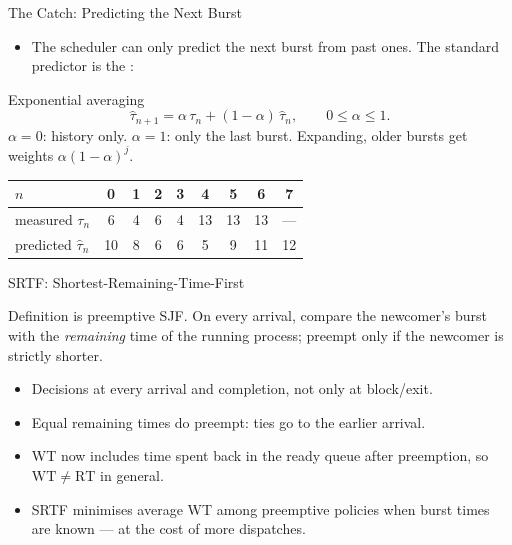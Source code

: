 \documentclass[aspectratio=169]{beamer}
\begin{document}
\begin{frame}{The Catch: Predicting the Next Burst}
  \begin{itemize}
    \item The scheduler can only predict the next burst from past ones. The
      standard predictor is the :
  \end{itemize}
  \begin{block}{Exponential averaging}
    \[
      \hat{\tau}_{n+1}=\alpha\,\tau_n+(1-\alpha)\,\hat{\tau}_n,
      \qquad 0\le\alpha\le1.
    \]
    $\alpha=0$: history only. $\alpha=1$: only the last burst. Expanding,
    older bursts get weights $\alpha(1-\alpha)^j$.
  \end{block}
  \vspace{0.05cm}
  \centering
  \scriptsize
  \begin{tabular}{lcccccccc}
    \toprule
    $n$ & 0 & 1 & 2 & 3 & 4 & 5 & 6 & 7 \\
    \midrule
    measured $\tau_n$ & 6 & 4 & 6 & 4 & 13 & 13 & 13 & --- \\
    predicted $\hat{\tau}_n$ & 10 & 8 & 6 & 6 & 5 & 9 & 11 & 12 \\
    \bottomrule
  \end{tabular}
  \vspace{0.1cm}
\end{frame}

\begin{frame}{SRTF: Shortest-Remaining-Time-First}
  \begin{block}{Definition}
     is preemptive SJF. On every arrival, compare the newcomer's
    burst with the \emph{remaining} time of the running process; preempt only
    if the newcomer is strictly shorter.
  \end{block}
  \begin{itemize}
    \item Decisions at every arrival and completion, not only at block/exit.
    \item Equal remaining times do  preempt: ties go to the earlier
      arrival.
    \item WT now includes time spent back in the ready queue after
      preemption, so $\mathrm{WT}\ne\mathrm{RT}$ in general.
    \item SRTF minimises average WT among preemptive policies when burst
      times are known --- at the cost of more dispatches.
  \end{itemize}
\end{frame}
\end{document}
